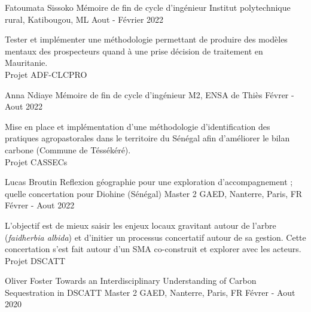 \begin{cventries}
    \cventry
        {Fatoumata Sissoko} %
        {Mémoire de fin de cycle d'ingénieur} %
        {Institut polytechnique rural, Katibougou, ML} %
        {Aout - Février 2022} %
        {
        \begin{cvitems} %
            Tester et implémenter une méthodologie permettant de produire des modèles mentaux des prospecteurs quand à une prise décision de traitement en Mauritanie.\\
            Projet ADF-CLCPRO
        \end{cvitems}
        }
    \cventry
        {Anna Ndiaye} %
        {Mémoire de fin de cycle d'ingénieur} %
        {M2, ENSA de Thiès} %
        {Févrer - Aout 2022} %
        {
        \begin{cvitems} %
            Mise en place et implémentation d'une méthodologie d'identification des pratiques agropastorales dans le territoire du Sénégal afin d’améliorer le bilan carbone (Commune de Téssékéré).\\
            Projet CASSECs
        \end{cvitems}
        }
    \cventry
        {Lucas Broutin} %
        {Reflexion géographie pour une exploration d'accompagnement ; quelle concertation pour Diohine (Sénégal)} %
        {Master 2 GAED, Nanterre, Paris, FR} %
        {Févrer - Aout 2022} %
        {
        \begin{cvitems} %
            L'objectif est de mieux saisir les enjeux locaux gravitant autour de l’arbre (\textit{faidherbia albida}) et d'initier un processus concertatif autour de sa gestion. Cette concertation s'est fait autour d'un SMA co-construit et explorer avec les acteurs.\\
            Projet DSCATT
        \end{cvitems}
        }
    \cventry
        {Oliver Foster} %
        {Towards an Interdisciplinary Understanding of Carbon Sequestration in
        DSCATT} %
        {Master 2 GAED, Nanterre, Paris, FR} %
        {Févrer - Aout 2020} %
        {
        \begin{cvitems} %

\end{cvitems}}
\end{cventries}

